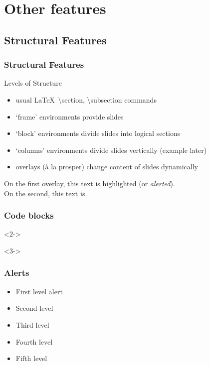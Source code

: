 \documentclass[aspectratio=169,handout]{beamer}
\begin{document}
    \section[]{Other features} %


    \subsection{Structural Features}
    \begin{frame}
        \frametitle{Structural Features}
        \begin{block}{Levels of Structure}
            \begin{itemize}
                \item usual \LaTeX\ \textbackslash{}section, \textbackslash{}subsection
                commands
                \item `frame' environments provide slides
                \item `block' environments divide slides into logical sections
                \item `columns' environments divide slides vertically (example later)
                \item overlays (\`a la prosper) change content of slides dynamically
            \end{itemize}
        \end{block}

        \begin{example}
            On the first overlay, \alert<1>{this text} is highlighted (or \emph{alerted}).\\ On the second, \alert<2>{this text} is.
        \end{example}
    \end{frame}

    \begin{frame}[fragile]
        \frametitle{Code blocks}
        
        \begin{uncoverenv}<2->
        \end{uncoverenv}
        \begin{uncoverenv}<3->
            
        \end{uncoverenv}

    \end{frame}

    \begin{frame}
        \frametitle{Alerts}
        \begin{itemize}
            \item First level \alert{alert}
            \item Second level 
            \item Third level 
            \item Fourth level 
            \item Fifth level 
        \end{itemize}

    \end{frame}
\end{document}
